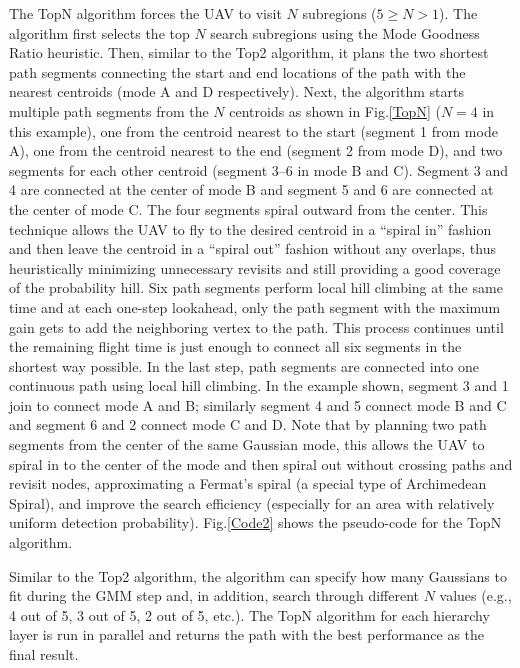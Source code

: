 \documentclass[journal]{IEEEtran}
\begin{document}
The TopN algorithm forces the UAV to visit $N$ subregions ($5\!\geq\!N\!>\!1$). The algorithm first selects the top $N$ search subregions using the Mode Goodness Ratio heuristic. Then, similar to the Top2 algorithm, it plans the two shortest path segments connecting the start and end locations of the path with the nearest centroids (mode A and D respectively). Next, the algorithm starts multiple path segments from the $N$ centroids as shown in Fig.\ref{TopN} ($N=4$ in this example), one from the centroid nearest to the start (segment 1 from mode A), one from the centroid nearest to the end (segment 2 from mode D), and two segments for each other centroid (segment 3--6 in mode B and C). Segment 3 and 4 are connected at the center of mode B and segment 5 and 6 are connected at the center of mode C. The four segments spiral outward from the center. This technique allows the UAV to fly to the desired centroid in a ``spiral in'' fashion and then leave the centroid in a ``spiral out'' fashion without any overlaps, thus heuristically minimizing unnecessary revisits and still providing a good coverage of the probability hill. Six path segments perform local hill climbing at the same time and at each one-step lookahead, only the path segment with the maximum gain gets to add the neighboring vertex to the path. This process continues until the remaining flight time is just enough to connect all six segments in the shortest way possible. In the last step, path segments are connected into one continuous path using local hill climbing. In the example shown, segment 3 and 1 join to connect mode A and B; similarly segment 4 and 5 connect mode B and C and segment 6 and 2 connect mode C and D. Note that by planning two path segments from the center of the same Gaussian mode, this allows the UAV to spiral in to the center of the mode and then spiral out without crossing paths and revisit nodes, approximating a Fermat's spiral (a special type of Archimedean Spiral), and improve the search efficiency (especially for an area with relatively uniform detection probability). Fig.\ref{Code2} shows the pseudo-code for the TopN algorithm.

Similar to the Top2 algorithm, the algorithm can specify how many Gaussians to fit during the GMM step and, in addition, search through different $N$ values (e.g., 4 out of 5, 3 out of 5, 2 out of 5, etc.). The TopN algorithm for each hierarchy layer is run in parallel and returns the path with the best performance as the final result.
\end{document}
